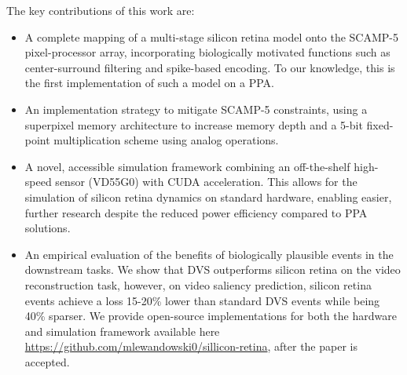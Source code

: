 \documentclass{article}
\begin{document}
The key contributions of this work are:

\begin{itemize}
    \item A complete mapping of a multi-stage silicon retina model onto the SCAMP-5 pixel-processor array, incorporating biologically motivated functions such as center-surround filtering and spike-based encoding. To our knowledge, this is the first implementation of such a model on a PPA.

    \item An implementation strategy to mitigate SCAMP-5 constraints, using a superpixel memory architecture to increase memory depth and a 5-bit fixed-point multiplication scheme using analog operations. 

    \item A novel, accessible simulation framework combining an off-the-shelf high-speed sensor (VD55G0) with CUDA acceleration. This allows for the simulation of silicon retina dynamics on standard hardware, enabling easier, further research despite the reduced power efficiency compared to PPA solutions.
    
    \item An empirical evaluation of the benefits of biologically plausible events in the downstream tasks. We show that DVS outperforms silicon retina on the video reconstruction task, however, on video saliency prediction, silicon retina events achieve a loss 15-20\% lower than standard DVS events while being 40\% sparser. We provide open-source implementations for both the hardware and simulation framework available here \href{https://github.com/mlewandowski0/sillicon-retina}{https://github.com/mlewandowski0/sillicon-retina}, after the paper is accepted.
    
\end{itemize}

\end{document}
